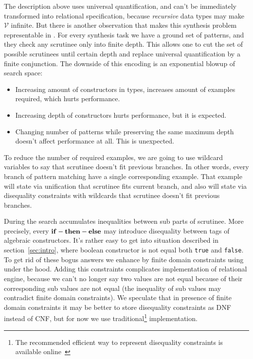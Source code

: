 \noindent The description above uses universal quantification, and can't be immediately transformed into relational specification, because \emph{recursive} data types may make $\mathcal{V}$ infinite.
But there is another observation that makes this synthesis problem representable in \miniKanren{}.
For every synthesis task we have a ground set of patterns, and they check any scrutinee only into finite depth.
This allows one to cut the set of possible scrutinees until certain depth and replace universal quantification by a finite conjunction.
The downside of this encoding is an exponential blowup of search space:
\begin{itemize}
\item Increasing amount of constructors in types, increases amount of examples required, which hurts performance.
\item Increasing depth of constructors hurts performance, but it is expected.
\item Changing number of patterns while preserving the same maximum depth doesn't affect performance at all. This is unexpected.
\end{itemize}

To reduce the number of required examples, we are going to use wildcard variables to say that scrutinee doesn't fit previous branches. In other words, every branch of pattern matching have a single corresponding example. 
That example will state via unification that scrutinee fits current branch, and also will state 
via disequality constraints with wildcards that scrutinee doesn't fit previous branches. 

During the search \OCanren{} accumulates inequalities between sub parts of scrutinee. 
More precisely, every $\mathbf{if-then-else}$ may introduce disequality between tags of algebraic constructors. It's rather easy to get into situation described in section~\ref{sec:intro}, where boolean constructor is not equal both \lstinline|true| and \lstinline|false|. 
To get rid of these bogus answers we enhance \OCanren{} by finite domain constraints using \Zthree{}~\cite{Zthree} under the hood. 
Adding this constraints complicates implementation of relational engine, because we can't no longer say two values are not equal because of their corresponding sub values are not equal (the inequality of sub values may contradict finite domain constraints). 
We speculate that in presence of finite domain constraints it may be better to store disequality constraints as DNF instead of CNF, but for now we use traditional\footnote{The recommended efficient way to represent disequality constraints is available online~\cite{fasterMK}} implementation.

